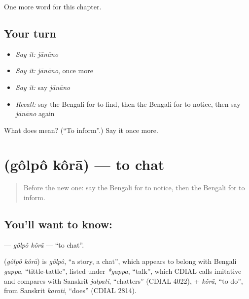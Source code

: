 \begin{grammarlens}[title={What you've built}]
One more word for this chapter.
\end{grammarlens}

\subsection*{Your turn}
\begin{itemize}
\raggedright
  \item \emph{Say it:} \emph{jānāno}
  \item \emph{Say it:} \emph{jānāno}, once more
  \item \emph{Say it:} say \emph{jānāno}
  \item \emph{Recall:} say the Bengali for to find, then the Bengali for to notice, then say \emph{jānāno} again
\end{itemize}

\begin{tcolorbox}[breakable,colback=teal!4,colframe=teal!35!black,title={Before you move on}]
What does  mean? (\textquotedblleft{}To inform\textquotedblright{}.) Say it once more.
\end{tcolorbox}
\section[\texorpdfstring{\bn{গল্প} \bn{করা} (gôlpô kôrā)}{গল্প করা (gôlpô kôrā)}]{  (gôlpô kôrā) — to chat}

\label{lesson:BN-C241-golpo-kora}



\begin{quote}
Before the new one: say the Bengali for to notice, then the Bengali for to inform.
\end{quote}

\subsection*{You'll want to know:  }
\textbf{ } — \emph{gôlpô kôrā} — \textquotedblleft{}to chat\textquotedblright{}.

\begin{cousinweb}
\textbf{ } (\emph{gôlpô kôrā}) is \emph{gôlpô}, \textquotedblleft{}a story, a chat\textquotedblright{}, which appears to belong with Bengali \emph{gappa}, \textquotedblleft{}tittle-tattle\textquotedblright{}, listed under \emph{*gappa}, \textquotedblleft{}talk\textquotedblright{}, which CDIAL calls imitative and compares with Sanskrit \emph{jalpati}, \textquotedblleft{}chatters\textquotedblright{} (CDIAL 4022), + \emph{kôrā}, \textquotedblleft{}to do\textquotedblright{}, from Sanskrit \emph{karoti}, \textquotedblleft{}does\textquotedblright{} (CDIAL 2814).
\end{cousinweb}

